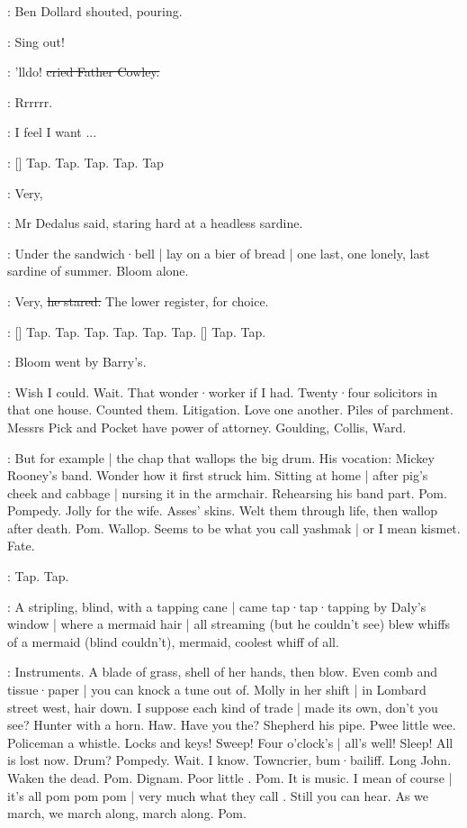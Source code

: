 :
Ben Dollard shouted,
pouring.

\dollard:
Sing out!

\cowley:
'lldo!
\sout{cried Father Cowley.}

:
Rrrrrr.

\BloomInt:
I feel I want ...

\stripling:
[]
Tap.
Tap.
Tap.
Tap.
Tap

\simon:
Very,

:
Mr Dedalus said,
staring hard at a headless sardine.

:
Under the sandwich·bell |
lay on a bier of bread |
one last,
one lonely,
last sardine of summer.
Bloom alone.

\simon:
Very,
\sout{he stared.}
The lower register,
for choice.

\stripling:
[]
Tap.
Tap.
Tap.
Tap.
Tap.
Tap.
[]
Tap.
Tap.

:
Bloom went by Barry's.

\BloomInt:
Wish I could.
Wait.
That wonder·worker if I had.
Twenty·four solicitors in that one house.
Counted them.
Litigation.
Love one another.
Piles of parchment.
Messrs Pick and Pocket have power of attorney.
Goulding,
Collis,
Ward.

\BloomInt:
But for example |
the chap that wallops the big drum.
His vocation:
Mickey Rooney's band.
Wonder how it first struck him.
Sitting at home |
after pig's cheek and cabbage |
nursing it in the armchair.
Rehearsing his band part.
Pom.
Pompedy.
Jolly for the wife.
Asses' skins.
Welt them through life,
then wallop after death.
Pom.
Wallop.
Seems to be what you call yashmak |
or I mean kismet.
Fate.

\stripling:
Tap.
Tap.

:
A stripling,
blind,
with a tapping cane |
came tap·tap·tapping
by Daly's window |
where a mermaid hair |
all streaming
(but he couldn't see)
blew whiffs of a mermaid
(blind couldn't),
mermaid,
coolest whiff of all.

\BloomInt:
Instruments.
A blade of grass,
shell of her hands,
then blow.
Even comb and tissue·paper |
you can knock a tune out of.
Molly in her shift |
in Lombard street west,
hair down.
I suppose each kind of trade |
made its own,
don't you see?
Hunter with a horn.
Haw.
Have you the?
Shepherd his pipe.
Pwee little wee.
Policeman a whistle.
Locks and keys!
Sweep!
Four o'clock's |
all's well!
Sleep!
All is lost now.
Drum?
Pompedy.
Wait.
I know.
Towncrier,
bum·bailiff.
Long John.
Waken the dead.
Pom.
Dignam.
Poor little .
Pom.
It is music.
I mean of course |
it's all pom pom pom |
very much what they call
.
Still you can hear.
As we march,
we march along,
march along.
Pom.

